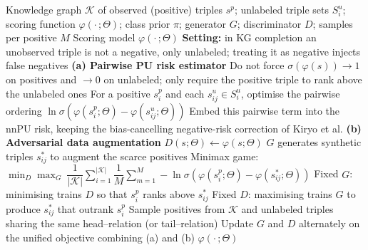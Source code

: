 \documentclass{article}
\begin{document}
\begin{algorithm}[!h]
\renewcommand{\algorithmicrequire}{\textbf{Input:}} %
\renewcommand{\algorithmicensure}{\textbf{Output:}} %
	\caption{PUDA (PU risk with adversarial data augmentation for KG completion)} %
	\begin{algorithmic}[1] %
	    \REQUIRE
	    Knowledge graph $\mathcal{K}$ of observed (positive) triples $s^{p}$;
	    unlabeled triple sets $S_{i}^{u}$; scoring function $\varphi(\cdot\,;\Theta)$;
	    class prior $\pi$; generator $G$; discriminator $D$; samples per positive $M$
	    \ENSURE
	    Scoring model $\varphi(\cdot\,;\Theta)$
	    \STATE \textbf{Setting:} in KG completion an unobserved triple is not a negative, only unlabeled;
	    treating it as negative injects false negatives %
	    \STATE \textbf{(a) Pairwise PU risk estimator}
	    \STATE \quad Do not force $\sigma(\varphi(s))\to 1$ on positives and $\to 0$ on unlabeled;
	    only require the positive triple to rank above the unlabeled ones %
	    \STATE \quad For a positive $s_{i}^{p}$ and each $s_{ij}^{u}\in S_{i}^{u}$, optimise the pairwise ordering
	    $\ln\sigma\!\left(\varphi(s_{i}^{p};\Theta)-\varphi(s_{ij}^{u};\Theta)\right)$
	    \STATE \quad Embed this pairwise term into the nnPU risk, keeping the bias-cancelling
	    negative-risk correction of Kiryo et al. %
	    \STATE \textbf{(b) Adversarial data augmentation}
	    \STATE \quad $D(s;\Theta)\leftarrow \varphi(s;\Theta)$ %
	    \STATE \quad $G$ generates synthetic triples $s_{ij}^{\ast}$ to augment the scarce positives %
	    \STATE \quad Minimax game:
	    $\min_{D}\max_{G}\ \dfrac{1}{|\mathcal{K}|}\sum_{i=1}^{|\mathcal{K}|}\dfrac{1}{M}\sum_{m=1}^{M}
	    -\ln\sigma\!\left(\varphi(s_{i}^{p};\Theta)-\varphi(s_{ij}^{\ast};\Theta)\right)$
	    \STATE \quad Fixed $G$: minimising trains $D$ so that $s_{i}^{p}$ ranks above $s_{ij}^{\ast}$
	    \STATE \quad Fixed $D$: maximising trains $G$ to produce $s_{ij}^{\ast}$ that outrank $s_{i}^{p}$ %
	    \STATE Sample positives from $\mathcal{K}$ and unlabeled triples sharing the same head--relation (or tail--relation)
	    \STATE Update $G$ and $D$ alternately on the unified objective combining (a) and (b)
	    \ENDWHILE
		\RETURN $\varphi(\cdot\,;\Theta)$
	\end{algorithmic}
\end{algorithm}
\end{document}
